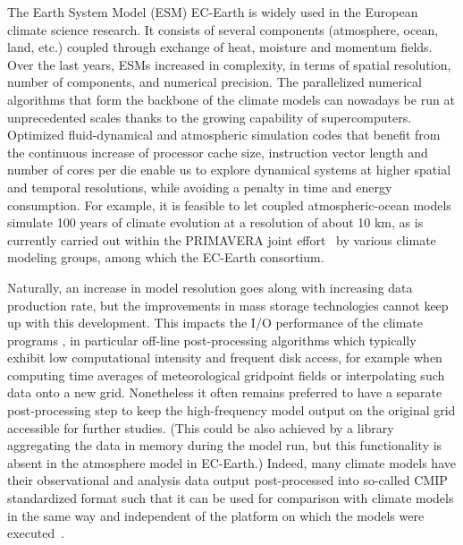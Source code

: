 \documentclass[procedia]{easychair}
\begin{document}

The Earth System Model (ESM) EC-Earth \cite{ECEARTHv22} is widely used in the 
European climate science research. It consists of several components 
(atmosphere, ocean, land, etc.) coupled through exchange of heat, moisture and 
momentum fields. Over the last years, ESMs increased in complexity, in terms of 
spatial resolution, number of components, and numerical precision. 
%
The parallelized numerical algorithms that form the backbone of the climate 
models
can nowadays be run at unprecedented scales thanks to the
growing capability of supercomputers. Optimized fluid-dynamical and atmospheric 
simulation codes that benefit from the continuous increase of processor cache 
size, instruction vector length and number of cores per die enable us to 
explore dynamical systems at higher spatial and temporal resolutions, while 
avoiding a penalty in time and energy consumption. For example, it is feasible 
to let coupled atmospheric-ocean models simulate 100 years of climate evolution 
at a resolution of about 10 km, as is currently carried out within the 
PRIMAVERA joint effort~\cite{PRIMAVERA} %
by various climate modeling groups, among which the EC-Earth consortium.

Naturally, an increase in model resolution goes along with increasing data 
production rate, but the improvements in mass storage technologies cannot keep 
up with this development. This impacts the I/O performance of the climate 
programs \cite{Asif20142370}, in particular off-line post-processing algorithms 
which typically exhibit low computational intensity and frequent disk access, 
for example when computing time averages of meteorological gridpoint fields or 
interpolating such data onto a new grid.
Nonetheless it often remains preferred to have a separate post-processing step 
to keep the high-frequency model output on the original grid accessible for 
further studies. (This could be also achieved by a library aggregating 
the data in memory during the model run, but this functionality is absent in 
the atmosphere model in EC-Earth.) Indeed, many climate models have their 
observational and analysis data output post-processed into so-called CMIP 
standardized format such that it can be used for comparison with climate models 
in
the same way and independent of the platform on which the models were 
executed~\cite{CMIP6}.
 
\end{document}
